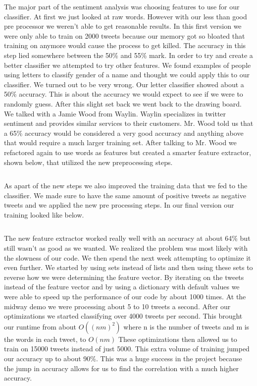 \documentclass{acm_proc_article-sp}
\begin{document}
The major part of the sentiment analysis was choosing features to use for our
classifier. At first we just looked at raw words. However with our less than
good pre processor we weren't able to get reasonable results. In this first
version we were only able to train on 2000 tweets because our memory got so
bloated that training on anymore would cause the process to get killed. The
accuracy in this step lied somewhere between the 50\% and 55\% mark. In order
to try and create a better classifier we attempted to try other features. We
found examples of people using letters to classify gender of a name and thought
we could apply this to our classifier. We turned out to be very wrong. Our
letter classifier showed about a 50\% accuracy. This is about the accuracy we
would expect to see if we were to randomly guess. After this slight set back we
went back to the drawing board.  We talked with a Jamie Wood from Waylin.
Waylin specializes in twitter sentiment and provides similar services to their
customers. Mr. Wood told us that a 65\% accuracy would be considered a very good
accuracy and anything above that would require a much larger training set.
After talking to Mr. Wood we refactored again to use words as features but
created a smarter feature extractor, shown below, that utilized the new
preprocessing steps.

\inputminted{python}{examples/featureExtractor.py}

As apart of the new steps we also improved the training data that we fed to the
classifier.  We made sure to have the same amount of positive tweets as
negative tweets and we applied the new pre processing steps. In our final
version our training looked like below.

\break
\inputminted{python}{examples/train.py}

The new feature extractor worked really well with an accuracy at about 64\% but
still wasn't as good as we wanted. We realized the problem was most likely with
the slowness of our code. We then spend the next week attempting to optimize it
even further. We started by using sets instead of lists and then using these
sets to reverse how we were determining the feature vector. By iterating on the
tweets instead of the feature vector and by using a dictionary with default
values we were able to speed up the performance of our code by about 1000
times. At the midway demo we were processing about 5 to 10 tweets a second.
After our optimizations we started classifying over 4000 tweets per second.
This brought our runtime from about $O((nm)^2)$ where n is the number of tweets
and m is the words in each tweet, to $O(nm)$ These optimizations then allowed
us to train on 15000 tweets instead of just 5000. This extra volume of training
jumped our accuracy up to about 90\%. This was a huge success in the project
because the jump in accuracy allows for us to find the correlation with a much
higher accuracy. 
\end{document}

